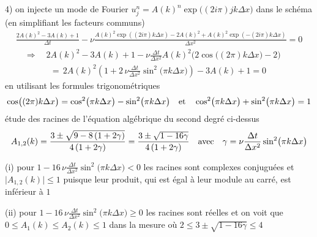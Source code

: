 \documentclass[12pt,a4paper]{article}
\begin{document}
4) on injecte un mode de Fourier $u_j^n=A(k)^n \exp\!\big( (2 i \pi) j k \Delta x \big)$ dans le sch\'ema 
(en simplifiant les facteurs communs)
$$
\begin{array}{l}
\displaystyle \frac{2 A(k)^2 - 3 A(k) + 1}{\Delta t} - \nu \frac{A(k)^2 \exp((2 i \pi) k \Delta x) - 2 A(k)^2 + A(k)^2 \exp(-(2 i \pi) k \Delta x)}{\Delta x^2} = 0 \\[2ex]
\quad \Longrightarrow \quad \displaystyle 2 A(k)^2 - 3 A(k) + 1 - \nu \frac{\Delta t}{\Delta x^2} A(k)^2 \big( 2 \cos\!\big( (2 \pi) k \Delta x \big) - 2 \big)  \\[2ex]
\qquad \qquad =\, \displaystyle 2 A(k)^2 \left( 1 + 2\,\nu \frac{\Delta t}{\Delta x^2} \sin^2\!\big( \pi k \Delta x \big) \right) - 3 A(k) + 1 = 0
\end{array}
$$
en utilisant les formules trigonom\'etriques
$$ \cos\!\big( (2 \pi) k \Delta x \big) = \cos^2\!\big( \pi k \Delta x \big) - \sin^2\!\big( \pi k \Delta x \big) \quad {\rm et} \quad \cos^2\!\big( \pi k \Delta x \big) + \sin^2\!\big( \pi k \Delta x \big) = 1 $$
\'etude des racines de l'\'equation alg\'ebrique du second degr\'e ci-dessus
$$ A_{1,2}(k) = \frac{3 \pm \sqrt{ 9 - 8 \left( 1 + 2 \gamma \right) }}{4 \left( 1 + 2 \gamma \right)} = \frac{3 \pm \sqrt{ 1 - 16 \gamma }}{4 \left( 1 + 2 \gamma \right)} \quad {\rm avec} \quad \gamma = \nu \frac{\Delta t}{\Delta x^2} \sin^2\!\big( \pi k \Delta x \big) $$

\noindent (i) pour $\displaystyle 1 - 16\,\nu \frac{\Delta t}{\Delta x^2} \sin^2\!\big( \pi k \Delta x \big) < 0$ les racines sont complexes conjugu\'ees et $\big| A_{1,2}(k) \big| \leq 1$ puisque leur produit, qui est \'egal à leur module au carr\'e, est inf\'erieur \`a $1$

\noindent (ii) pour $\displaystyle 1 - 16\,\nu \frac{\Delta t}{\Delta x^2} \sin^2\!\big( \pi k \Delta x \big) \geq 0$ les racines sont r\'eelles et on voit que $0 \leq A_1(k) \leq A_2(k) \leq 1$ dans la mesure o\`u $ 2 \leq 3 \pm \sqrt{1-16\gamma} \leq 4$
\end{document}
